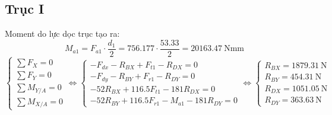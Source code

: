 \subsection{Trục I}
Moment do lực dọc trục tạo ra:
\[
    M_{a1} = F_{a1} \cdot \frac{d_1}{2} 
           = 756.177 \cdot \frac{53.33}{2} 
           = 20163.47\ \text{Nmm}
\]
\[
    \left\{
    \begin{array}{l}
        \sum F_X = 0 \\
        \sum F_Y = 0 \\
        \sum M_{Y/A} = 0 \\
        \sum M_{X/A} = 0
    \end{array}
    \right.
    \Leftrightarrow
    \left\{
    \begin{array}{l}
        -F_{dx} - R_{BX} + F_{t1} - R_{DX} = 0 \\
        -F_{dy} - R_{BY} + F_{r1} - R_{DY} = 0  \\
        -52 R_{BX} + 116.5 F_{t1} - 181R_{DX} = 0 \\
        -52 R_{BY} + 116.5 F_{r1} - M_{a1} - 181 R_{DY} = 0
    \end{array}
    \right.
    \Leftrightarrow
    \left\{
    \begin{array}{l}
        R_{BX} = 1879.31\ \text{N} \\
        R_{BY} = 454.31\ \text{N} \\
        R_{DX} = 1051.05\ \text{N} \\
        R_{DY} = 363.63\ \text{N}
    \end{array}
    \right.
\]
